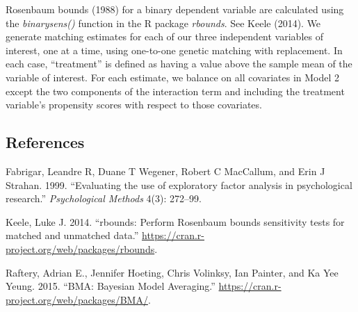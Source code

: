 \documentclass[12pt,]{article}
\begin{document}
Rosenbaum bounds (1988) for a binary dependent variable are calculated using the \emph{binarysens()} function in the R package \emph{rbounds}. See Keele (2014). We generate matching estimates for each of our three independent
variables of interest, one at a time, using one-to-one genetic matching
with replacement. In each case, ``treatment'' is defined as having a
value above the sample mean of the variable of interest. For each
estimate, we balance on all covariates in Model 2 except the two
components of the interaction term and including the treatment
variable's propensity scores with respect to those covariates.

\clearpage

\subsection{References}

Fabrigar, Leandre R, Duane T Wegener, Robert C MacCallum, and Erin J
Strahan. 1999. ``Evaluating the use of exploratory factor analysis in
psychological research.'' \emph{Psychological Methods} 4(3): 272--99.

Keele, Luke J. 2014. ``rbounds: Perform Rosenbaum bounds sensitivity
tests for matched and unmatched data.''
\url{https://cran.r-project.org/web/packages/rbounds}.

Raftery, Adrian E., Jennifer Hoeting, Chris Volinksy, Ian Painter, and Ka Yee Yeung. 2015. ``BMA: Bayesian Model Averaging.''
\url{https://cran.r-project.org/web/packages/BMA/}.
\end{document}

